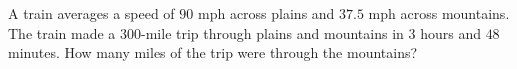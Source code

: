 A train averages a speed of $90$ mph across plains and $37.5$ mph across mountains. The train made a $300$-mile trip through plains and mountains in $3$ hours and $48$ minutes. How many miles of the trip were through the mountains?
